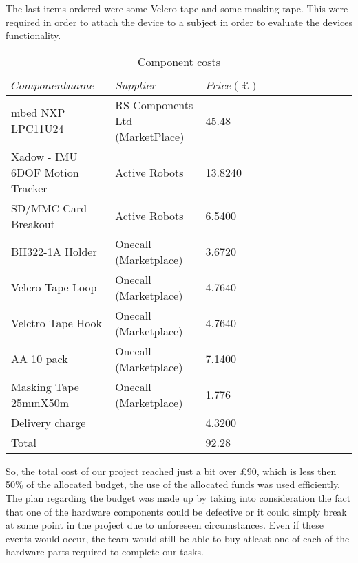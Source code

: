 The last items ordered were some Velcro tape and some masking tape. This were required in order to attach the device to a subject in order to evaluate the devices functionality.
\begin{table}[h]
	\centering
	\caption{Component costs}
	\label{table: 1}
	\begin{tabular}{lllllllllll}
		\hline
		$Component name$ & $Supplier$ & $Price(\pounds)$ \\
		\hline
		mbed NXP LPC11U24 & RS Components Ltd (MarketPlace) & 45.48\\
		\hline
		Xadow - IMU 6DOF Motion Tracker & Active Robots & 13.8240 \\
		\hline
		SD/MMC Card Breakout & Active Robots & 6.5400 \\
		\hline
		BH322-1A  Holder &  Onecall (Marketplace) & 3.6720 \\
		\hline
		Velcro Tape Loop &  Onecall (Marketplace) & 4.7640 \\
		\hline
		Velctro Tape Hook &  Onecall (Marketplace) & 4.7640 \\
		\hline
		AA 10 pack &  Onecall (Marketplace) & 7.1400 \\
		\hline
		Masking Tape 25mmX50m &  Onecall (Marketplace) &1.776 \\
		\hline 
		Delivery charge &  & 4.3200	\\
		\hline	
		Total &  & 92.28 \\
		\end{tabular}
			
\end{table}

So, the total cost of our project reached just a bit over £90, which is less then 50\% of the allocated budget,  the use of the allocated funds was used efficiently. The plan regarding the budget was made up by taking into consideration the fact that one of the hardware components could be defective or it could simply break at some point in the project due to unforeseen circumstances. Even if these events would occur, the team would still be able to buy atleast one of each of the hardware parts required to complete our tasks.